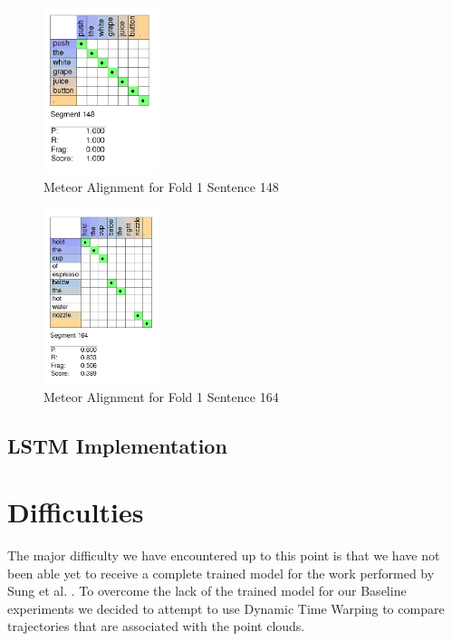 \documentclass[letterpaper, 12 pt, conference]{ieeeconf}
\begin{document}
\begin{figure}[htb!]
  \centering
  \includegraphics[width=0.3\textwidth]{fold_1_sentence_148}
  \caption{Meteor Alignment for Fold 1 Sentence 148}
  \label{fig:fold_1_sentence_148}
\end{figure}

\begin{figure}[htb!]
  \centering
  \includegraphics[width=0.3\textwidth]{fold_1_sentence_164}
  \caption{Meteor Alignment for Fold 1 Sentence 164}
  \label{fig:fold_1_sentence_164}
\end{figure}

\subsection{LSTM Implementation}

\section{Difficulties}

The major difficulty we have encountered up to this point is that we have not been able yet to receive a complete trained model for the work performed by Sung et al. \cite{sung2016robobarista}. To overcome the lack of the trained model for our Baseline experiments we decided to attempt to use Dynamic Time Warping to compare trajectories that are associated with the point clouds. 
\end{document}
